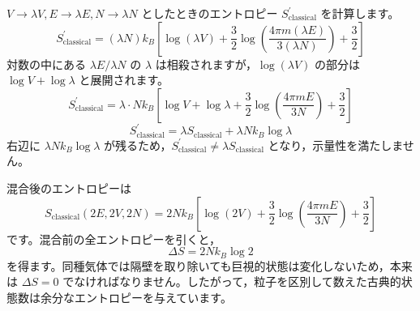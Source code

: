 \solutionheading
\begin{solutionparts}

$V \to \lambda V, E \to \lambda E, N \to \lambda N$ としたときのエントロピー $S_{\mathrm{classical}}^\prime$ を計算します。
\begin{equation*}
S_{\mathrm{classical}}^\prime = (\lambda N) k_B \left[ \log (\lambda V) + \frac{3}{2} \log \left( \frac{4\pi m (\lambda E)}{3(\lambda N)} \right) + \frac{3}{2} \right]
\end{equation*}
対数の中にある $\lambda E / \lambda N$ の $\lambda$ は相殺されますが，$\log (\lambda V)$ の部分は $\log V + \log \lambda$ と展開されます。
\begin{equation*}
S_{\mathrm{classical}}^\prime = \lambda \cdot N k_B \left[ \log V + \log \lambda + \frac{3}{2} \log \left( \frac{4\pi m E}{3N} \right) + \frac{3}{2} \right]
\end{equation*}
\begin{equation*}
S_{\mathrm{classical}}^\prime = \lambda S_{\mathrm{classical}} + \lambda N k_B \log \lambda
\end{equation*}
右辺に $\lambda N k_B \log \lambda$ が残るため，$S_{\mathrm{classical}}^\prime \neq \lambda S_{\mathrm{classical}}$ となり，示量性を満たしません。

混合後のエントロピーは
\begin{equation*}
S_{\mathrm{classical}}(2E,2V,2N)
=2Nk_B\left[\log(2V)+\frac{3}{2}\log\left(\frac{4\pi mE}{3N}\right)+\frac{3}{2}\right]
\end{equation*}
です。混合前の全エントロピーを引くと，
\begin{equation*}
\Delta S=2Nk_B\log 2
\end{equation*}
を得ます。同種気体では隔壁を取り除いても巨視的状態は変化しないため，本来は $\Delta S=0$ でなければなりません。したがって，粒子を区別して数えた古典的状態数は余分なエントロピーを与えています。


\end{solutionparts}
